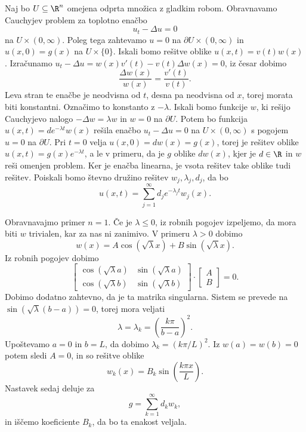 
Naj bo $U \subseteq \R^n$ omejena odprta množica z gladkim robom.
Obravnavamo Cauchyjev problem za toplotno enačbo
\[
  u_t - \Delta u = 0
\]
na $U \times (0,\infty)$.
Poleg tega zahtevamo $u=0$ na $\partial U \times (0,\infty)$ in $u(x,0) = g(x)$
na $U \times \{0\}$.
Iskali bomo rešitve oblike $u(x,t) = v(t) w(x)$.
Izračunamo $u_t - \Delta u = w(x) v'(t) - v(t) \Delta w(x) = 0$, iz česar dobimo
\[
  \frac{\Delta w(x)}{w(x)} = \frac{v'(t)}{v(t)}.
\]
Leva stran te enačbe je neodvisna od $t$, desna pa neodvisna od $x$, torej
morata biti konstantni.
Označimo to konstanto z $-\lambda$.
Iskali bomo funkcije $w$, ki rešijo Cauchyjevo nalogo $- \Delta w = \lambda w$
in $w = 0$ na $\partial U$.
Potem bo funkcija $u(x,t) = d e^{-\lambda t} w(x)$ rešila enačbo $u_t - \Delta u
= 0$ na $U \times (0,\infty)$ s pogojem $u = 0$ na $\partial U$.
Pri $t = 0$ velja $u(x,0) = d w(x) = g(x)$, torej je rešitev oblike $u(x,t) =
g(x) e^{-\lambda t}$, a le v primeru, da je $g$ oblike $d w(x)$, kjer je $d \in
\R$ in $w$ reši omenjen problem.
Ker je enačba linearna, je vsota rešitev take oblike tudi rešitev.
Poiskali bomo števno družino rešitev $w_j, \lambda_j, d_j$, da bo
\[
  u(x,t) = \sum_{j=1}^\infty d_j e^{-\lambda_j t} w_j(x).
\]


Obravnavajmo primer $n=1$.
Če je $\lambda \le 0$, iz robnih pogojev izpeljemo, da mora biti $w$ trivialen,
kar za nas ni zanimivo.
V primeru $\lambda > 0$ dobimo
\[
  w(x) = A \cos(\sqrt{\lambda} x) + B \sin(\sqrt{\lambda} x).
\]
Iz robnih pogojev dobimo
\[
  \begin{bmatrix}
	\cos(\sqrt{\lambda} a) & \sin(\sqrt{\lambda} a) \\
	\cos(\sqrt{\lambda} b) & \sin(\sqrt{\lambda} b)
  \end{bmatrix}
  \cdot
  \begin{bmatrix}
	A \\ B
  \end{bmatrix}
  = 0.
\]
Dobimo dodatno zahtevno, da je ta matrika singularna.
Sistem se prevede na $\sin(\sqrt{\lambda} (b-a)) = 0$, torej mora veljati
\[
  \lambda = \lambda_k = \left( \frac{k \pi}{b-a} \right)^2.
\]
Upoštevamo $a = 0$ in $b = L$, da dobimo $\lambda_k = (k \pi / L)^2$.
Iz $w(a) = w(b) = 0$ potem sledi $A = 0$, in so rešitve oblike
\[
  w_k(x) = B_k \sin(\frac{k \pi x}{L}).
\]
Nastavek sedaj deluje za
\[
  g = \sum_{k=1}^\infty d_k w_k,
\]
in iščemo koeficiente $B_k$, da bo ta enakost veljala.

